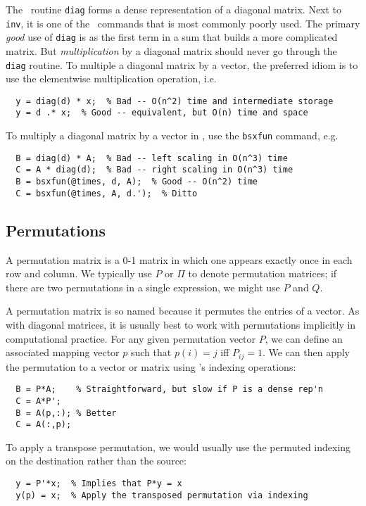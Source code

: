 \documentclass[12pt, leqno]{article} %
\begin{document}
The \matlab\ routine {\tt diag} forms a dense representation of a
diagonal matrix.  Next to {\tt inv}, it is one of the \matlab\ commands
that is most commonly poorly used.  The primary {\em good} use of
{\tt diag} is as the first term in a sum that builds a more complicated matrix.
But {\em multiplication} by a diagonal matrix should never go through the
{\tt diag} routine.  To multiple a diagonal matrix by a vector, the preferred
idiom is to use the elementwise multiplication operation, i.e.
\begin{lstlisting}
  y = diag(d) * x;  % Bad -- O(n^2) time and intermediate storage
  y = d .* x;  % Good -- equivalent, but O(n) time and space
\end{lstlisting}
To multiply a diagonal matrix by a vector in \matlab, use the {\tt bsxfun}
command, e.g.
\begin{lstlisting}
  B = diag(d) * A;  % Bad -- left scaling in O(n^3) time
  C = A * diag(d);  % Bad -- right scaling in O(n^3) time
  B = bsxfun(@times, d, A);  % Good -- O(n^2) time
  C = bsxfun(@times, A, d.');  % Ditto
\end{lstlisting}

\subsection{Permutations}

A permutation matrix is a 0-1 matrix in which one appears exactly
once in each row and column.  We typically use $P$ or $\Pi$ to
denote permutation matrices; if there are two permutations in a
single expression, we might use $P$ and $Q$.

A permutation matrix is so named because it permutes the entries
of a vector.  As with diagonal matrices, it is usually best to
work with permutations implicitly in computational practice.
For any given permutation vector $P$, we can define an associated
mapping vector $p$ such that $p(i) = j$ iff $P_{ij} = 1$.  We can
then apply the permutation to a vector or matrix using \matlab's
indexing operations:
\begin{lstlisting}
  B = P*A;    % Straightforward, but slow if P is a dense rep'n
  C = A*P';
  B = A(p,:); % Better
  C = A(:,p);
\end{lstlisting}
To apply a transpose permutation, we would usually use the permuted
indexing on the destination rather than the source:
\begin{lstlisting}
  y = P'*x;  % Implies that P*y = x
  y(p) = x;  % Apply the transposed permutation via indexing
\end{lstlisting}
\end{document}
